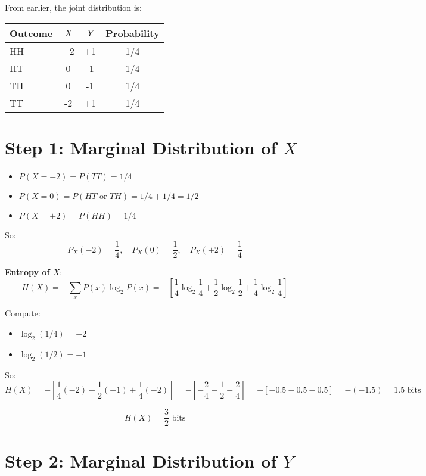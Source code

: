 \documentclass{article}
\begin{document}
From earlier, the joint distribution is:

\begin{center}
\begin{tabular}{lccc}
\toprule
Outcome & \(X\) & \(Y\) & Probability \\
\midrule
HH      & +2   & +1   & 1/4         \\
HT      & 0    & -1   & 1/4         \\
TH      & 0    & -1   & 1/4         \\
TT      & -2   & +1   & 1/4         \\
\bottomrule
\end{tabular}
\end{center}

\section*{Step 1: Marginal Distribution of \(X\)}

\begin{itemize}
\item \(P(X = -2) = P(TT) = 1/4\)
    \item \(P(X = 0) = P(HT \text{ or } TH) = 1/4 + 1/4 = 1/2\)
    \item \(P(X = +2) = P(HH) = 1/4\)
\end{itemize}

So:
\[
P_X(-2) = \frac{1}{4}, \quad P_X(0) = \frac{1}{2}, \quad P_X(+2) = \frac{1}{4}
\]

\textbf{Entropy of \(X\)}:
\[
H(X) = -\sum_x P(x) \log_2 P(x) = -\left[ \frac{1}{4} \log_2 \frac{1}{4} + \frac{1}{2} \log_2 \frac{1}{2} + \frac{1}{4} \log_2 \frac{1}{4} \right]
\]

Compute:
\begin{itemize}
\item \(\log_2(1/4) = -2\)
    \item \(\log_2(1/2) = -1\)
\end{itemize}
So:
\[
H(X) = -\left[ \frac{1}{4}(-2) + \frac{1}{2}(-1) + \frac{1}{4}(-2) \right] = -\left[ -\frac{2}{4} - \frac{1}{2} - \frac{2}{4} \right] = -\left[ -0.5 - 0.5 - 0.5 \right] = -(-1.5) = 1.5 \text{ bits}
\]

\[
\boxed{H(X) = \frac{3}{2} \text{ bits}}
\]

\section*{Step 2: Marginal Distribution of \(Y\)}
\end{document}
